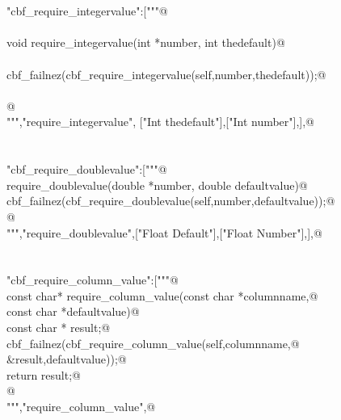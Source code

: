 \documentclass[10pt,a4paper,twoside,notitlepage]{article}
\begin{document}
\begin{flushleft}
\begin{minipage}{\linewidth}
\begin{list}{}{}
\mbox{}\verb@@\\
\mbox{}\verb@@\\
\mbox{}\verb@"cbf_require_integervalue":["""@\\
\mbox{}\verb@%apply int *OUTPUT {int *number} require_integervalue;@\\
\mbox{}\verb@@\\
\mbox{}\verb@     void require_integervalue(int *number, int thedefault){@\\
\mbox{}\verb@@\\
\mbox{}\verb@     cbf_failnez(cbf_require_integervalue(self,number,thedefault));@\\
\mbox{}\verb@@\\
\mbox{}\verb@     }@\\
\mbox{}\verb@""","require_integervalue", ["Int thedefault"],["Int number"],],@\\
\mbox{}\verb@@\\
\mbox{}\verb@@\\
\mbox{}\verb@"cbf_require_doublevalue":["""@\\
\mbox{}\verb@%apply double *OUTPUT {double *number} require_doublevalue;@\\
\mbox{}\verb@void require_doublevalue(double *number, double defaultvalue){@\\
\mbox{}\verb@   cbf_failnez(cbf_require_doublevalue(self,number,defaultvalue));@\\
\mbox{}\verb@}@\\
\mbox{}\verb@""","require_doublevalue",["Float Default"],["Float Number"],],@\\
\mbox{}\verb@@\\
\mbox{}\verb@@\\
\mbox{}\verb@"cbf_require_column_value":["""@\\
\mbox{}\verb@ const char* require_column_value(const char *columnname,@\\
\mbox{}\verb@                                  const char *defaultvalue){@\\
\mbox{}\verb@   const char * result;@\\
\mbox{}\verb@   cbf_failnez(cbf_require_column_value(self,columnname,@\\
\mbox{}\verb@                                    &result,defaultvalue));@\\
\mbox{}\verb@   return result;@\\
\mbox{}\verb@}@\\
\mbox{}\verb@""","require_column_value",@\\

\end{list}
\end{minipage}
\end{flushleft}
\end{document}

